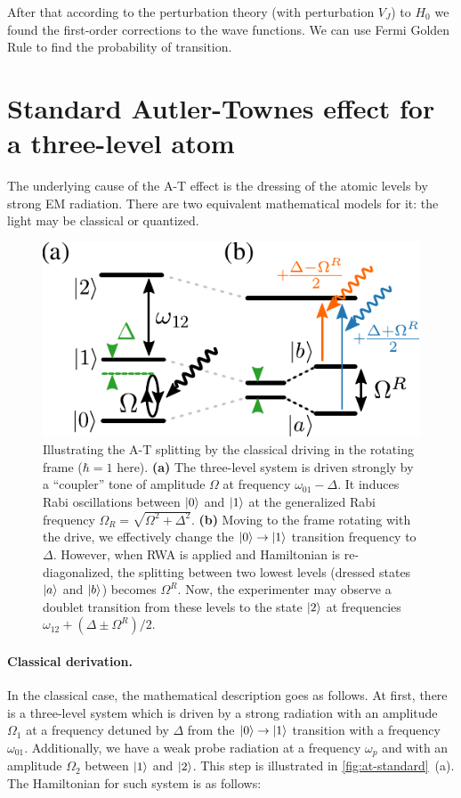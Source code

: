 \documentclass[%
 aip,
 amsmath,amssymb,
 reprint,%
]{revtex4-1}
\begin{document}
After that according to the perturbation theory (with perturbation $V_J$) to $H_0$ we found the first-order corrections to the wave functions. We can use Fermi Golden Rule to find the probability of transition.
\appendix

\section{Standard Autler-Townes effect for a three-level atom} \label{sec:3-level-at}

The underlying cause of the A-T effect is the dressing of the atomic levels by strong EM radiation. There are two equivalent mathematical models for it: the light may be classical or quantized.

\begin{figure}
	\includegraphics[width=\linewidth]{intro_scheme}
	\caption{Illustrating the A-T splitting by  the classical driving in the rotating frame ($\hbar=1$ here). \textbf{(a)} The three-level system is driven strongly by a ``coupler'' tone of amplitude $\Omega$ at frequency $\omega_{01}-\Delta$. It induces Rabi oscillations between $\ket{0}$ and $\ket{1}$ at the generalized Rabi frequency $\Omega_R = \sqrt{\Omega^2 + \Delta^2}$. \textbf{(b)} Moving to the frame rotating with the drive, we effectively change the $\ket{0}\rightarrow \ket{1}$ transition frequency to $\Delta$. However, when RWA is applied and Hamiltonian is re-diagonalized, the splitting between two lowest levels (dressed states $\ket{a}$ and $\ket{b}$) becomes $\Omega^R$. Now, the experimenter may observe a doublet transition from these levels to the state $\ket{2}$ at frequencies $\omega_{12}+(\Delta \pm \Omega^R)/2$.} 
	\label{fig:at-standard}
\end{figure}

\paragraph{Classical derivation.} In the classical case, the mathematical description goes as follows. At first, there is a three-level system which is driven by a strong radiation with an amplitude $\Omega_1$ at a frequency detuned by $\Delta$ from the $\ket{0}\rightarrow \ket{1}$ transition with a frequency $\omega_{01}$. Additionally, we have a weak probe radiation at a frequency $\omega_{p}$ and with an amplitude $\Omega_2$ between $\ket{1}$ and $\ket{2}$. This step is illustrated in \autoref{fig:at-standard}~(a). The Hamiltonian for such system is as follows:
\end{document}
